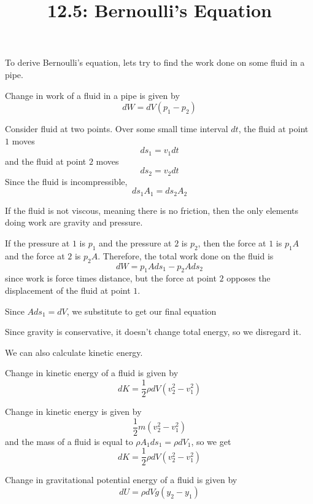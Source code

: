 \documentclass{article}
\title{12.5: Bernoulli's Equation}
\begin{document}
\maketitle

To derive Bernoulli's equation, lets try to find the work done on some fluid in a pipe.

\begin{theorem}
Change in work of a fluid in a pipe is given by $$dW = dV(p_1 - p_2)$$
\end{theorem}

\begin{customproof}

    
    Consider fluid at two points. Over some small time interval $dt$, the fluid at point $1$ moves $$ds_1 = v_1dt$$and the fluid at point $2$ moves $$ds_2 = v_2 dt$$Since the fluid is incompressible, $$ds_1A_1 = ds_2A_2$$
    
    If the fluid is not viscous, meaning there is no friction, then the only elements doing work are gravity and pressure.
    
    If the pressure at $1$ is $p_1$ and the pressure at $2$ is $p_2$, then the force at $1$ is $p_1A$ and the force at $2$ is $p_2A$. Therefore, the total work done on the fluid is $$dW = p_1Ads_1 - p_2Ads_2$$since work is force times distance, but the force at point $2$ opposes the displacement of the fluid at point $1$. 

    Since $Ads_1 = dV$, we substitute to get our final equation
    
\end{customproof}
    Since gravity is conservative, it doesn't change total energy, so we disregard it.
    
    We can also calculate kinetic energy.

\begin{theorem}
Change in kinetic energy of a fluid is given by $$dK = \frac{1}{2}\rho dV (v_2^2 - v_1^2)$$
\end{theorem}

\begin{customproof}
Change in kinetic energy is given by $$\frac{1}{2}m(v_2^2 - v_1^2)$$and the mass of a fluid is equal to $\rho A_1 ds_1 = \rho dV_1$, so we get $$dK = \frac{1}{2} \rho dV (v_2^2 - v_1^2)$$
\end{customproof}

\begin{theorem}
Change in gravitational potential energy of a fluid is given by $$dU = \rho dV g (y_2 - y_1)$$
\end{theorem}
\end{document}
